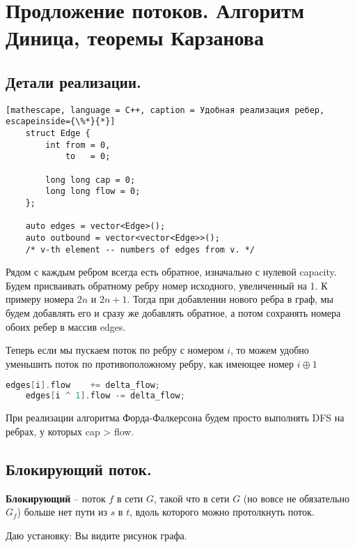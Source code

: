 \section{Продложение потоков. Алгоритм Диница, теоремы Карзанова}%
\label{sec:Продложение потоков. Алгоритм Диница, теоремы Карзанова}

\subsection{Детали реализации.}%
\label{sub:Детали реализации.}


\begin{lstlisting}[mathescape, language = C++, caption = Удобная реализация ребер, escapeinside={\%*}{*}] 
	struct Edge {
		int from = 0,
		    to   = 0;

		long long cap = 0;
		long long flow = 0;
	};

	auto edges = vector<Edge>();
	auto outbound = vector<vector<Edge>>(); 
	/* v-th element -- numbers of edges from v. */
\end{lstlisting}

Рядом с каждым ребром всегда есть обратное, изначально с нулевой capacity. Будем присваивать обратному ребру номер исходного, увеличенный на 1. К примеру номера $2n$ и $2n + 1$.
Тогда при добавлении нового ребра в граф, мы будем добавлять его и сразу же добавлять обратное, а потом сохранять номера обоих ребер в массив edges.

Теперь если мы пускаем поток по ребру с номером $i$, то можем удобно уменьшить поток по противоположному ребру, как имеющее номер $i \oplus 1$

\begin{lstlisting}[language = C++]
	edges[i].flow	 += delta_flow;
	edges[i ^ 1].flow -= delta_flow;
\end{lstlisting}
При реализации алгоритма Форда-Фалкерсона будем просто выполнять DFS на ребрах, у которых cap > flow.

\subsection{Блокирующий поток.}%

\begin{Def}
	\textbf{Блокирующий} --  поток $f$ в сети  $G$, такой что в сети  $G$ (но вовсе не обязательно $G_f$) больше нет пути из $s$ в  $t$, вдоль которого можно протолкнуть поток. 
\end{Def}
\begin{example}
	Даю установку: Вы видите рисунок графа.
\end{example}

